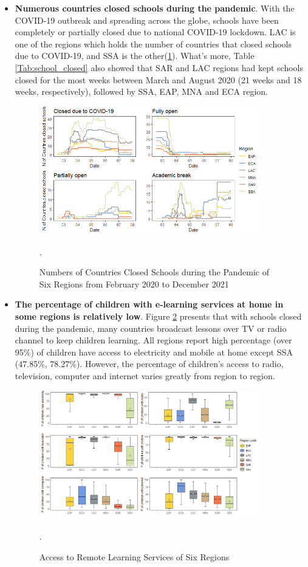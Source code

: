 \documentclass{article}
\begin{document}
\begin{itemize}
\item \textbf{Numerous countries closed schools during the pandemic}. With the COVID-19 outbreak and spreading across the globe, schools have been completely or partially closed due to national COVID-19 lockdown. LAC is one of the regions which holds the number of countries that closed schools due to COVID-19, and SSA is the other(\ref{fig:school_closed}). What's more, Table \ref{Tab:school_closed} also showed that SAR and LAC regions had kept schools closed for the most weeks between March and August 2020 (21 weeks and 18 weeks, respectively), followed by SSA, EAP, MNA and ECA region.

\begin{figure}[ht!]
\centering
 \includegraphics[width=0.9\textwidth]{school_closed.png}
\caption{Numbers of Countries Closed Schools during the Pandemic of Six Regions from February 2020 to December 2021}.
\label{fig:school_closed}
\end{figure}

\item \textbf{The percentage of children with e-learning services at home in some regions is relatively low}. Figure \ref{fig:remote_learning} presents that with schools closed during the pandemic, many countries broadcast lessons over TV or radio channel to keep children learning. All regions report high percentage (over 95\%) of children have access to electricity and mobile at home except SSA (47.85\%, 78.27\%). However, the percentage of children’s access to radio, television, computer and internet varies greatly from region to region.

\begin{figure}[ht!]
\centering
 \includegraphics[width=0.9\textwidth]{remote_learning.png}
\caption{Access to Remote Learning Services of Six Regions}.
\label{fig:remote_learning}
\end{figure}


\end{itemize}
\end{document}
